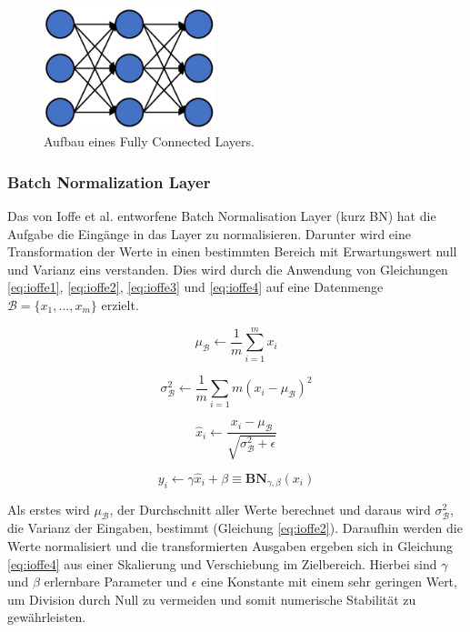 \begin{figure}[h!]
\centering
\includegraphics[width=5cm]{98_images/fc_layer.png}
\caption{Aufbau eines Fully Connected Layers.}
\label{fig:fc-layer}
\end{figure}


\subsubsection{Batch Normalization Layer}\label{batch-normalization-sec}
Das von Ioffe et al. \cite{pmlr-v37-ioffe15} entworfene Batch Normalisation Layer (kurz BN) hat die Aufgabe die Eingänge in das Layer zu normalisieren. Darunter wird eine Transformation der Werte in einen bestimmten Bereich mit Erwartungswert null und Varianz eins verstanden. Dies wird durch die Anwendung von Gleichungen \ref{eq:ioffe1}, \ref{eq:ioffe2}, \ref{eq:ioffe3} und \ref{eq:ioffe4} auf eine Datenmenge $\mathcal{B} = \{x_1, ..., x_m \}$ erzielt. \cite{pmlr-v37-ioffe15}

\begin{equation}\label{eq:ioffe1}
\mu_\mathcal{B} \gets \frac{1}{m} \sum_{i=1}^{m}x_i
\end{equation}

\begin{equation}\label{eq:ioffe2}
\sigma^2_\mathcal{B} \gets \frac{1}{m} \sum_{i=1}{m}(x_i - \mu_\mathcal{B})^2
\end{equation}

\begin{equation}\label{eq:ioffe3}
\hat{x}_i \gets \frac{x_i - \mu_\mathcal{B}}{\sqrt{\sigma^2_\mathcal{B} + \epsilon}}
\end{equation}

\begin{equation}\label{eq:ioffe4}
y_i \gets \gamma \hat{x}_i + \beta \equiv \textbf{BN}_{\gamma , \beta}(x_i)
\end{equation}

\mypar Als erstes wird $\mu_\mathcal{B}$, der Durchschnitt aller Werte berechnet und daraus wird $\sigma^2_\mathcal{B}$, die Varianz der Eingaben, bestimmt (Gleichung \ref{eq:ioffe2}). Daraufhin werden die Werte normalisiert und die transformierten Ausgaben ergeben sich in Gleichung \ref{eq:ioffe4} aus einer Skalierung und Verschiebung im Zielbereich. Hierbei sind $\gamma$ und $\beta$ erlernbare Parameter und $\epsilon$ eine Konstante mit einem sehr geringen Wert, um Division durch Null zu vermeiden und somit numerische Stabilität zu gewährleisten. \cite{pmlr-v37-ioffe15}

